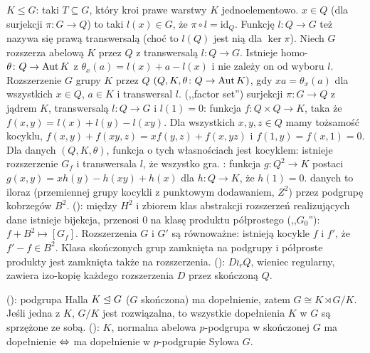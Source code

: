   $K \le G$: taki $T \subseteq G$, który kroi prawe warstwy $K$ jednoelementowo.
 $x \in Q$ (dla surjekcji $\pi \colon G \to Q$) to taki $l(x) \in G$, że $\pi \circ l = \textrm{id}_Q$.
Funkcję $l \colon Q \to G$ też nazywa się prawą transwersalą (choć to $l(Q)$ jest nią dla $\ker \pi$).
Niech $G$ rozszerza abelową $K$ przez $Q$ z transwersalą $l \colon Q \to G$.
Istnieje homo- $\theta \colon Q \to \operatorname{Aut} K$ z $\theta_x(a) = l(x) + a - l(x)$ i nie zależy on od wyboru $l$.
Rozszerzenie $G$ grupy $K$ przez $Q$  $(Q, K, \theta \colon Q \to \operatorname{Aut} K)$, gdy $xa = \theta_x(a)$ dla wszystkich $x \in Q$, $a \in K$ i transwersal $l$.
 (,,factor set'') surjekcji $\pi \colon G \to Q$ z jądrem $K$, transwersalą $l \colon Q \to G$ i $l(1) = 0$: funkcja $f \colon Q \times Q \to K$, taka że $f(x, y) = l(x) + l(y) - l(xy)$.
Dla wszystkich $x, y, z \in Q$ mamy tożsamość kocyklu, $f(x, y) + f(xy, z) = xf(y,z) + f(x, yz)$ i $f(1, y) = f(x, 1) = 0$.
Dla danych $(Q, K, \theta)$, funkcja o tych własnościach jest kocyklem: istnieje rozszerzenie $G_f$ i transwersala $l$, że wszystko gra.
: funkcja $g \colon Q^2 \to K$ postaci $g(x,y) = xh(y) - h(xy) + h(x)$ dla $h \colon Q \to K$, że $h(1) = 0$.
 danych to iloraz (przemiennej grupy kocykli z punktowym dodawaniem, $Z^2$) przez podgrupę kobrzegów $B^2$.
 (): między $H^2$ i zbiorem klas abstrakcji rozszerzeń realizujących dane istnieje bijekcja, przenosi $0$ na klasę produktu półprostego (,,$G_0$''): $f + B^2 \mapsto [G_f]$.
Rozszerzenia $G$ i $G'$ są równoważne: istnieją kocykle $f$ i $f'$, że $f' - f \in B^2$.
Klasa skończonych grup zamknięta na podgrupy i półproste produkty jest zamknięta także na rozszerzenia.
 (): $D \wr_r Q$, wieniec regularny, zawiera izo-kopię każdego rozszerzenia $D$ przez skończoną $Q$.


  (): podgrupa Halla $K \trianglelefteq G$ ($G$ skończona) ma dopełnienie, zatem $G \cong K \rtimes G/K$.
Jeśli jedna z $K$, $G/K$ jest rozwiązalna, to wszystkie dopełnienia $K$ w $G$ są sprzężone ze sobą.
 (): $K$, normalna abelowa $p$-podgrupa w skończonej $G$ ma dopełnienie $\Leftrightarrow$ ma dopełnienie w $p$-podgrupie Sylowa $G$.

